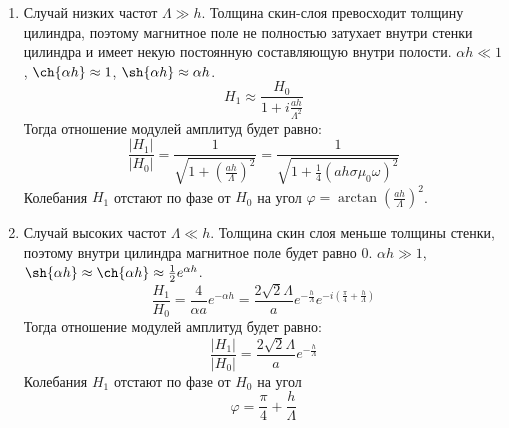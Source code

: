\begin{enumerate}
	\item Случай низких частот $\Lambda \gg h$. Толщина скин-слоя превосходит толщину цилиндра, поэтому магнитное поле не полностью затухает внутри стенки цилиндра и имеет некую постоянную составляющую внутри полости. $\alpha h \ll 1$, $\ch{\alpha h} \approx 1$, $\sh{\alpha h} \approx \alpha h$.
	$$
	H_1 \approx \frac{H_0}{1 + i \frac{ah}{\Lambda^2}}
	$$
	Тогда отношение модулей амплитуд будет равно:
	$$
	\frac{|H_1|}{|H_0|} = \frac{1}{\sqrt{1 + \left( \frac{ah}{\Lambda} \right)^2}} = \frac{1}{\sqrt{1 + \frac{1}{4} \left( a h \sigma \mu_0 \omega \right)^2}}
	$$
	Колебания $H_1$ отстают по фазе от $H_0$ на угол $\varphi = \arctan \left( \frac{ah}{\Lambda} \right)^2 $.
	
	\item Случай высоких частот $\Lambda \ll h$. Толщина скин слоя меньше толщины стенки, поэтому внутри цилиндра магнитное поле будет равно 0. $\alpha h \gg 1$, $\sh{\alpha h} \approx \ch{\alpha h} \approx \frac{1}{2} e^{\alpha h}$.
	$$
	\frac{H_1}{H_0} = \frac{4}{\alpha a} e^{- \alpha h} = \frac{2\sqrt{2}\Lambda}{a} e^{-\frac{h}{\Lambda}} e^{-i \left( \frac{\pi}{4} + \frac{h}{\Lambda}\right)}
	$$
	Тогда отношение модулей амплитуд будет равно:
	$$
	\frac{|H_1|}{|H_0|} = \frac{2\sqrt{2}\Lambda}{a} e^{-\frac{h}{\Lambda}}
	$$
	Колебания $H_1$ отстают по фазе от $H_0$ на угол 
	\begin{equation}
		\varphi = \frac{\pi}{4} + \frac{h}{\Lambda}
		\label{formula:delta_phi}
	\end{equation}
\end{enumerate}

